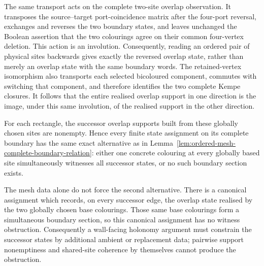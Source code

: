 \begin{lemma}
The same transport acts on the complete two-site overlap observation.  It
transposes the source--target port-coincidence matrix after the four-port
reversal, exchanges and reverses the two boundary states, and leaves unchanged
the Boolean assertion that the two colourings agree on their common
four-vertex deletion.  This action is an involution.  Consequently, reading an
ordered pair of physical sites backwards gives exactly the reversed overlap
state, rather than merely an overlap state with the same boundary words.
The retained-vertex isomorphism also transports each selected bicoloured
component, commutes with switching that component, and therefore identifies
the two complete Kempe closures.  It follows that the entire realised overlap
support in one direction is the image, under this same involution, of the
realised support in the other direction.

For each rectangle, the successor overlap supports built from these globally
chosen sites are nonempty.  Hence every finite state assignment on its
complete boundary has the same exact alternative as in
Lemma~\ref{lem:ordered-mesh-complete-boundary-relation}: either one concrete
colouring at every globally based site simultaneously witnesses all successor
states, or no such boundary section exists.

The mesh data alone do not force the second alternative.  There is a
canonical assignment which records, on every successor edge, the overlap
state realised by the two globally chosen base colourings.  Those same base
colourings form a simultaneous boundary section, so this canonical assignment
has no witness obstruction.  Consequently a wall-facing holonomy argument
must constrain the successor states by additional ambient or replacement
data; pairwise support nonemptiness and shared-site coherence by themselves
cannot produce the obstruction.
\end{lemma}

